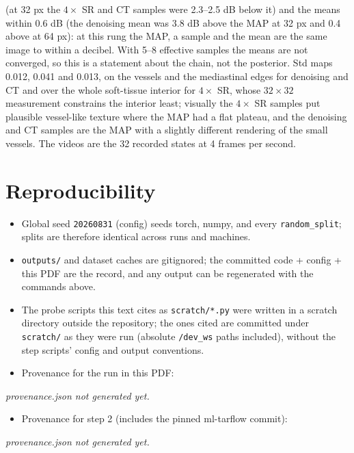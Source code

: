\documentclass[11pt]{article}
\begin{document}
\begin{itemize}
        (at 32 px the $4\times$ SR and CT samples were 2.3--2.5 dB below
        it) and the means within 0.6 dB (the denoising mean was 3.8 dB
        above the MAP at 32 px and 0.4 above at 64 px): at this rung the
        MAP, a sample and the mean are the same image to within a
        decibel. With 5--8 effective samples the means are not converged,
        so this is a statement about the chain, not the posterior. Std maps 0.012,
        0.041 and 0.013, on the vessels and the mediastinal edges for
        denoising and CT and over the whole soft-tissue interior for
        $4\times$ SR, whose $32 \times 32$ measurement constrains the
        interior least; visually the $4\times$ SR samples put plausible
        vessel-like texture where the MAP had a flat plateau, and the
        denoising and CT samples are the MAP with a slightly different
        rendering of the small vessels. The videos are the 32 recorded
        states at 4 frames per second.
\end{itemize}


\section{Reproducibility}
\begin{itemize}
  \item Global seed \texttt{20260831} (config) seeds torch, numpy, and every
        \texttt{random\_split}; splits are therefore identical across runs
        and machines.
  \item \texttt{outputs/} and dataset caches are gitignored; the committed
        code + config + this PDF are the record, and any output can be
        regenerated with the commands above.
  \item The probe scripts this text cites as \texttt{scratch/*.py} were
        written in a scratch directory outside the repository; the ones
        cited are committed under \texttt{scratch/} as they were run
        (absolute \texttt{/dev\_ws} paths included), without the step
        scripts' config and output conventions.
  \item Provenance for the run in this PDF:
\end{itemize}
{\scriptsize
{}
  {}
  {\emph{provenance.json not generated yet.}}}

\begin{itemize}
  \item Provenance for step 2 (includes the pinned ml-tarflow commit):
\end{itemize}
{\scriptsize
{}
  {}
  {\emph{provenance.json not generated yet.}}}
\end{document}
